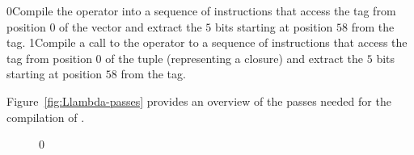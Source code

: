 \documentclass[7x10]{TimesAPriori_MIT}%
\def\racketEd{0}
\def\pythonEd{1}
\def\edition{1}
\newcommand{\racket}[1]{{\if\edition\racketEd{#1}\fi}}
\newcommand{\pythonColor}[0]{}
\newcommand{\python}[1]{{\if\edition\pythonEd\pythonColor #1\fi}}
\numberwithin{theorem}{chapter}
\numberwithin{definition}{chapter}
\numberwithin{equation}{chapter}
\begin{document}
\racket{Compile the  operator into a sequence of
instructions that access the tag from position $0$ of the vector and
extract the $5$ bits starting at position $58$ from the tag.}
%
\python{Compile a call to the  operator to a sequence of
instructions that access the tag from position $0$ of the tuple
(representing a closure) and extract the $5$ bits starting at position
$58$ from the tag.}

Figure~\ref{fig:Llambda-passes} provides an overview of the passes
needed for the compilation of \LangLam{}.

\begin{figure}[bthp]
  \begin{tcolorbox}[colback=white]
{\if\edition\racketEd    
{}}
\end{tcolorbox}
\end{figure}
\end{document}
